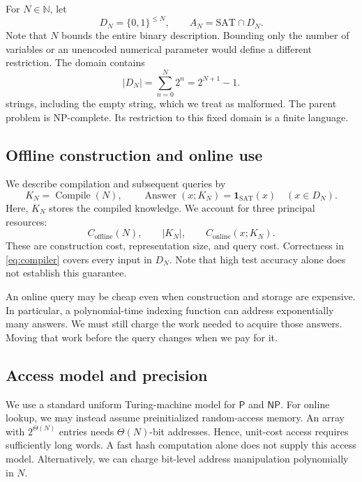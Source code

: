 \documentclass[11pt,a4paper]{article}
\numberwithin{equation}{section}
\newcommand{\Pclass}{\mathsf{P}}
\newcommand{\NPclass}{\mathsf{NP}}
\newcommand{\SAT}{\mathrm{SAT}}
\newcommand{\bits}{\{0,1\}}
\newcommand{\ind}{\mathbf{1}}
\newcommand{\Compile}{\operatorname{Compile}}
\newcommand{\Answer}{\operatorname{Answer}}
\theoremstyle{plain}
\theoremstyle{definition}
\theoremstyle{remark}
\begin{document}
For $N\in\mathbb{N}$, let
\begin{equation}
D_N=\bits^{\leq N},\qquad A_N=\SAT\cap D_N.
\label{eq:domain}
\end{equation}
Note that $N$ bounds the entire binary description. Bounding only the number of variables or an unencoded numerical parameter would define a different restriction. The domain contains
\begin{equation}
|D_N|=\sum_{n=0}^{N}2^n=2^{N+1}-1.
\end{equation}
strings, including the empty string, which we treat as malformed. The parent problem is NP-complete. Its restriction to this fixed domain is a finite language.

\subsection{Offline construction and online use}

We describe compilation and subsequent queries by
\begin{equation}
K_N=\Compile(N),\qquad
\Answer(x;K_N)=\ind_{\SAT}(x)\quad(x\in D_N).
\label{eq:compiler}
\end{equation}
Here, $K_N$ stores the compiled knowledge. We account for three principal resources:
\begin{equation}
C_{\mathrm{offline}}(N),\qquad |K_N|,\qquad
C_{\mathrm{online}}(x;K_N).
\label{eq:resources}
\end{equation}
These are construction cost, representation size, and query cost. Correctness in \eqref{eq:compiler} covers every input in $D_N$. Note that high test accuracy alone does not establish this guarantee.

An online query may be cheap even when construction and storage are expensive. In particular, a polynomial-time indexing function can address exponentially many answers. We must still charge the work needed to acquire those answers. Moving that work before the query changes when we pay for it.

\subsection{Access model and precision}

We use a standard uniform Turing-machine model for $\Pclass$ and $\NPclass$. For online lookup, we may instead assume preinitialized random-access memory. An array with $2^{\Theta(N)}$ entries needs $\Theta(N)$-bit addresses. Hence, unit-cost access requires sufficiently long words. A fast hash computation alone does not supply this access model. Alternatively, we can charge bit-level address manipulation polynomially in $N$.
\end{document}
